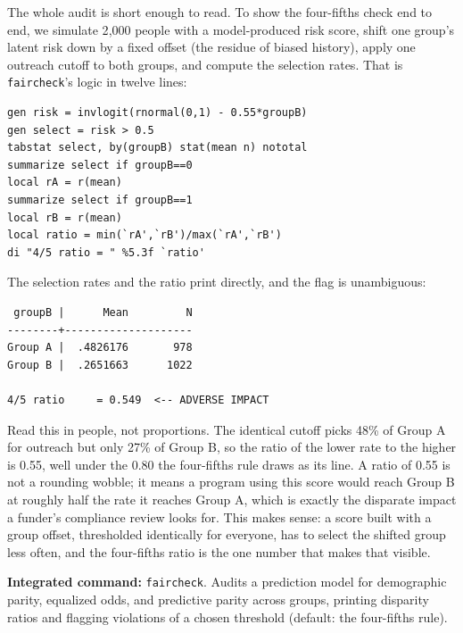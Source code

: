 \documentclass[
    a4paper,
    fontsize=10pt,
    twoside=true,
    numbers=noenddot,
]{kaobook}
\begin{document}
The whole audit is short enough to read. To show the four-fifths check end to end, we simulate 2{,}000 people with a model-produced risk score, shift one group's latent risk down by a fixed offset (the residue of biased history), apply one outreach cutoff to both groups, and compute the selection rates. That is \texttt{faircheck}'s logic in twelve lines:
{\footnotesize
\begin{verbatim}
gen risk = invlogit(rnormal(0,1) - 0.55*groupB)
gen select = risk > 0.5
tabstat select, by(groupB) stat(mean n) nototal
summarize select if groupB==0
local rA = r(mean)
summarize select if groupB==1
local rB = r(mean)
local ratio = min(`rA',`rB')/max(`rA',`rB')
di "4/5 ratio = " %5.3f `ratio'
\end{verbatim}
}
The selection rates and the ratio print directly, and the flag is unambiguous:
{\footnotesize
\begin{verbatim}
 groupB |      Mean         N
--------+--------------------
Group A |  .4826176       978
Group B |  .2651663      1022

4/5 ratio     = 0.549  <-- ADVERSE IMPACT
\end{verbatim}
}
Read this in people, not proportions. The identical cutoff picks 48\% of Group A for outreach but only 27\% of Group B, so the ratio of the lower rate to the higher is 0.55, well under the 0.80 the four-fifths rule draws as its line. A ratio of 0.55 is not a rounding wobble; it means a program using this score would reach Group B at roughly half the rate it reaches Group A, which is exactly the disparate impact a funder's compliance review looks for. This makes sense: a score built with a group offset, thresholded identically for everyone, has to select the shifted group less often, and the four-fifths ratio is the one number that makes that visible.

\begin{kaobox}[frametitle=Package Integration: \texttt{faircheck}]
\textbf{Integrated command:} \texttt{faircheck}. Audits a prediction model for demographic parity, equalized odds, and predictive parity across groups, printing disparity ratios and flagging violations of a chosen threshold (default: the four-fifths rule).
\end{kaobox}
\end{document}
